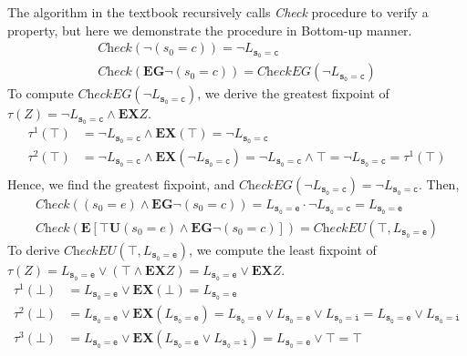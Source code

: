 \documentclass[a4paper,11pt]{article}
\theoremstyle{mytheor}
\begin{document}
The algorithm in the textbook recursively calls \textit{Check} procedure to 
verify a property, but here we demonstrate the procedure in Bottom-up manner.
\begin{equation*}
 \begin{array}{l}
  \textit{Check}(\neg(s_0 = c)) = \neg L_{\mathtt{s_0=c}} \\
  \textit{Check}(\textbf{EG} \neg(s_0 = c)) = \textit{CheckEG}(\neg L_{\mathtt{s_0=c}})
 \end{array}
\end{equation*}
To compute $\textit{CheckEG}(\neg L_{\mathtt{s_0=c}})$, we derive the greatest
fixpoint of $\tau(Z) = \neg L_{\mathtt{s_0=c}} \wedge \textbf{EX} Z$.
\begin{equation*}
 \begin{array}{ll}
  \tau^{1}(\top) &= \neg L_{\mathtt{s_0=c}} \wedge \textbf{EX}(\top) = \neg L_{\mathtt{s_0=c}} \\
  \tau^{2}(\top) &= \neg L_{\mathtt{s_0=c}} \wedge \textbf{EX}(\neg L_{\mathtt{s_0=c}}) 
                  = \neg L_{\mathtt{s_0=c}} \wedge \top = \neg L_{\mathtt{s_0=c}} 
                  = \tau^{1}(\top) \\
 \end{array}
\end{equation*}
Hence, we find the greatest fixpoint, and 
$\textit{CheckEG}(\neg L_{\mathtt{s_0=c}}) = \neg L_{\mathtt{s_0=c}}$. Then,
\begin{equation*}
 \begin{array}{l}
  \textit{Check}((s_0 = e) \wedge \textbf{EG} \neg(s_0 = c)) 
     = L_{\mathtt{s_0 = e}} \cdot \neg L_{\mathtt{s_0=c}} = L_{\mathtt{s_0 = e}}\\
  \textit{Check}(\textbf{E}[\top \textbf{U}(s_0 = e) \wedge \textbf{EG} \neg(s_0 = c)])
     = \textit{CheckEU}(\top, L_{\mathtt{s_0 = e}})
 \end{array}
\end{equation*}
To derive $\textit{CheckEU}(\top, L_{\mathtt{s_0 = e}})$, we compute the least
fixpoint of $\tau(Z) = L_{\mathtt{s_0 = e}} \vee (\top \wedge\textbf{EX} Z)
= L_{\mathtt{s_0 = e}} \vee \textbf{EX} Z$.
\begin{equation*}
 \begin{array}{ll}
  \tau^{1}(\bot) &
     = L_{\mathtt{s_0 = e}} \vee \textbf{EX}(\bot) = L_{\mathtt{s_0 = e}} \\
  \tau^{2}(\bot) &
     = L_{\mathtt{s_0 = e}} \vee \textbf{EX}(L_{\mathtt{s_0 = e}})
     = L_{\mathtt{s_0 = e}} \vee L_{\mathtt{s_0 = e}} \vee L_{\mathtt{s_0 = i}}
     = L_{\mathtt{s_0 = e}} \vee L_{\mathtt{s_0 = i}} \\
  \tau^{3}(\bot) &
     = L_{\mathtt{s_0 = e}} \vee \textbf{EX}(L_{\mathtt{s_0 = e}} \vee L_{\mathtt{s_0 = i}})
     = L_{\mathtt{s_0 = e}} \vee \top = \top \\
 \end{array}
\end{equation*} 
\end{document}
